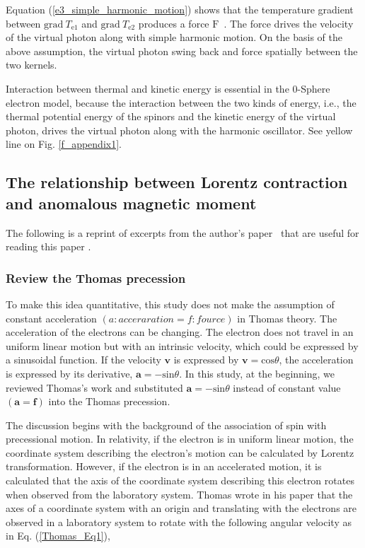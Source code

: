 \documentclass[%
 reprint,
 amsmath,amssymb,
 aps,
]{revtex4-1}
\numberwithin{equation}{section}%
\begin{document}
    Equation (\ref{e3_simple_harmonic_motion}) shows that the temperature gradient between $\mathrm{grad} \ T_{\mathrm{e1}}$ and $\mathrm{grad} \ T_{\mathrm{e2}}$ produces a force $\bm{\mathrm{F}}$~\cite{hanamura2018}. The force drives the velocity of the virtual photon along with simple harmonic motion. On the basis of the above assumption, the virtual photon swing back and force spatially between the two kernels.
    
    Interaction between thermal and kinetic energy is essential in the 0-Sphere electron model, because the interaction between the two kinds of energy, i.e., the thermal potential energy of the spinors and the kinetic energy of the virtual photon, drives the virtual photon along with the harmonic oscillator. See yellow line on Fig. \ref{f_appendix1}.


\subsection{\label{sec:The relationship between}The relationship between Lorentz contraction and anomalous magnetic moment} 

The following is a reprint of excerpts from the author's paper~\cite{hanamura2023} that are useful for reading this paper .

\subsubsection{\label{sec:Review the Thomas}Review the Thomas precession} 

To make this idea quantitative, this study does not make the assumption of constant acceleration $(a: acceraration = f: fource)$ in Thomas theory. The acceleration of the electrons can be changing. The electron does not travel in an uniform linear motion but with an intrinsic velocity, which could be expressed by a sinusoidal function. If the velocity ${\boldsymbol v}$ is expressed by ${\boldsymbol v} = \mathrm{cos}\theta$, the acceleration is expressed by its derivative, ${\boldsymbol a} = - \mathrm{sin}\theta$. In this study, at the beginning, we reviewed Thomas's work and substituted ${\boldsymbol a} = -\mathrm{sin}\theta$ instead of constant value $({\boldsymbol a} = {\boldsymbol f})$ into the Thomas precession. 

The discussion begins with the background of the association of spin with precessional motion. In relativity, if the electron is in uniform linear motion, the coordinate system describing the electron's motion can be calculated by Lorentz transformation. However, if the electron is in an accelerated motion, it is calculated that the axis of the coordinate system describing this electron rotates when observed from the laboratory system. Thomas wrote in his paper that the axes of a coordinate system with an origin and translating with the electrons are observed in a laboratory system to rotate with the following angular velocity as in Eq. (\ref{Thomas_Eq1}),
\end{document}
